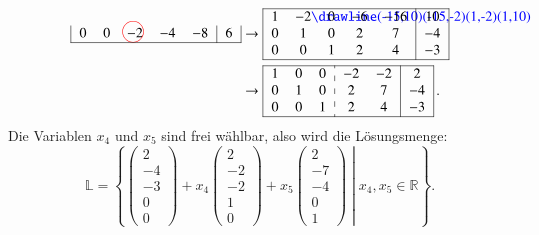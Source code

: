 \begin{beispiel}
\begin{align*}
\begin{tabular}{|>{$}c<{$}>{$}c<{$}>{$}c<{$}>{$}c<{$}>{$}c<{$}|>{$}c<{$}|}
   0&  0& -2%
\begin{picture}(0,0)
\color{red}\put(-7,4){\circle{15}}
\end{picture}%
& -4& -8&  6\\
\hline
\end{tabular}
&
\rightarrow
\begin{tabular}{|>{$}c<{$}>{$}c<{$}>{$}c<{$}>{$}c<{$}>{$}c<{$}|>{$}c<{$}|}
\hline
   1& -2%
\begin{picture}(0,0)
\color{blue}\drawline(-15,10)(-15,-2)(1,-2)(1,10)
\end{picture}%
&  0& -6&-16& 10\\
   0&  1&  0&  2&  7& -4\\
   0&  0&  1&  2&  4& -3\\
\hline
\end{tabular}
\\
&
\rightarrow
\begin{tabular}{|>{$}c<{$}>{$}c<{$}>{$}c<{$}:>{$}c<{$}>{$}c<{$}|>{$}c<{$}|}
\hline
   1&  0&  0& -2& -2&  2\\
   0&  1&  0&  2&  7& -4\\
   0&  0&  1&  2&  4& -3\\
\hline
\end{tabular}\,.
\end{align*}
Die Variablen $x_4$ und $x_5$ sind frei wählbar, also wird die 
Lösungsmenge:
\[
\mathbb L=
\left\{
\left.
\begin{pmatrix}2\\-4\\-3\\0\\0\end{pmatrix}
+x_4\begin{pmatrix}2\\-2\\-2\\1\\0\end{pmatrix}
+x_5\begin{pmatrix}2\\-7\\-4\\0\\1\end{pmatrix}
\;
\right|
\;
x_4,x_5\in\mathbb R
\right\}.
\]
\end{beispiel}

